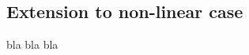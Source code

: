 \documentclass[a4paper,10pt]{article}
\begin{document}
\begin{multicols}{2}
\section{Extension to non-linear case}
\textsf{bla bla bla}
\label{sec:nonlinear}


\end{multicols}
\end{document}
